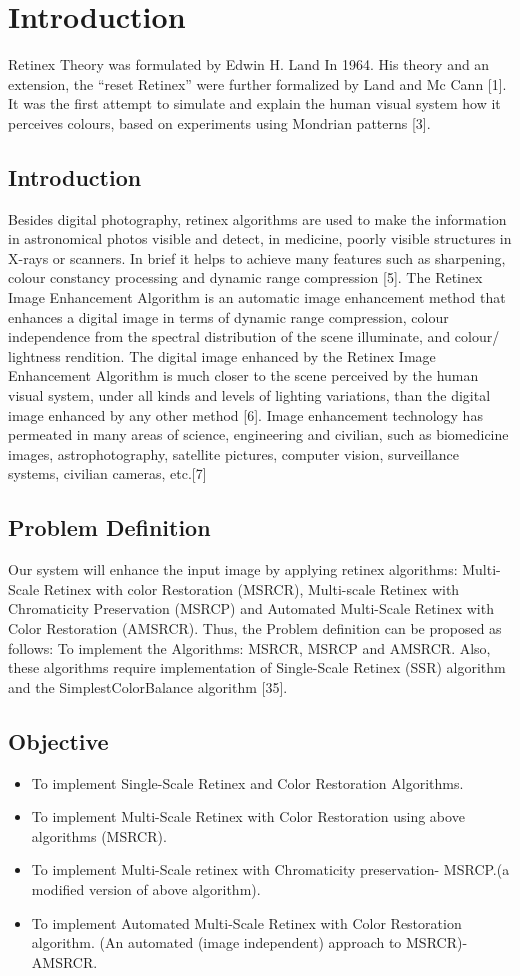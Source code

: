 \chapter{Introduction}
Retinex Theory was formulated by Edwin H. Land In 1964. His theory and an extension, the “reset Retinex” were further formalized by Land and Mc Cann [1]. It was the first attempt to simulate and explain the human visual system how it perceives colours, based on experiments using Mondrian patterns [3].
\section{Introduction}
Besides digital photography, retinex algorithms are used to make the information in astronomical photos visible and detect, in medicine, poorly visible structures in X-rays or scanners. In brief it helps to achieve many features such as sharpening, colour constancy processing and dynamic range compression [5]. The Retinex Image Enhancement Algorithm is an automatic image enhancement method that enhances a digital image in terms of dynamic range compression, colour independence from the spectral distribution of the scene illuminate, and colour/ lightness rendition. The digital image enhanced by the Retinex Image Enhancement Algorithm is much closer to the scene perceived by the human visual system, under all kinds and levels of lighting variations, than the digital image enhanced by any other method [6]. Image enhancement technology has permeated in many areas of science, engineering and civilian, such as biomedicine images, astrophotography, satellite pictures, computer vision, surveillance systems, civilian cameras, etc.[7]

\section{Problem Definition}
Our system will enhance the input image by applying retinex algorithms: Multi-Scale Retinex with color Restoration (MSRCR), Multi-scale Retinex with Chromaticity Preservation (MSRCP) and Automated Multi-Scale Retinex with Color Restoration (AMSRCR). Thus, the Problem definition can be proposed as follows: To implement the Algorithms: MSRCR, MSRCP and AMSRCR. Also, these algorithms require implementation of Single-Scale Retinex (SSR) algorithm and the SimplestColorBalance algorithm [35].
\section{Objective}
	\begin{itemize}
		\item To implement Single-Scale Retinex and Color Restoration Algorithms.
		\item To implement Multi-Scale Retinex with Color Restoration using above 
		algorithms (MSRCR).
		\item To implement Multi-Scale retinex with Chromaticity preservation- MSRCP.(a 
		modified version of above algorithm).
		\item To implement Automated Multi-Scale Retinex with Color Restoration algorithm.	
		(An automated (image independent) approach to MSRCR)- AMSRCR.
	\end{itemize}
	
